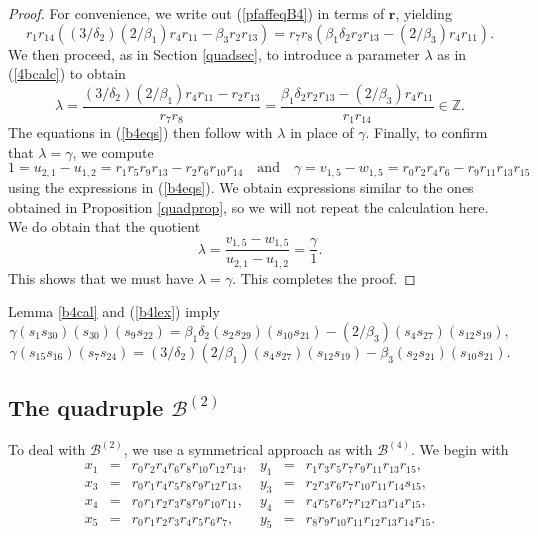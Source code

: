 \documentclass[letterpaper,10pt]{amsart}
\newcommand{\bZ}{{\mathbb{Z}}}
\newcommand{\Br}{{\mathbf{r}}}
\newcommand{\B}{{\mathcal{B}}}
\theoremstyle{definition}
\numberwithin{equation}{section}
\begin{document}
\begin{proof} For convenience, we write out (\ref{pfaffeqB4}) in terms of $\Br$, yielding 
\begin{equation} \label{pfaffeqb4} r_1 r_{14} ((3/\delta_2)(2/\beta_1) r_4 r_{11} - \beta_3 r_2 r_{13}) = r_7 r_8 (\beta_1 \delta_2 r_2 r_{13} - (2/\beta_3) r_4 r_{11}).
\end{equation}
We then proceed, as in Section \ref{quadsec}, to introduce a parameter $\lambda$ as in (\ref{4bcalc}) to obtain 
\[\lambda = \frac{(3/\delta_2)(2/\beta_1) r_4 r_{11} - r_2 r_{13}}{r_7 r_8} = \frac{\beta_1 \delta_2 r_2 r_{13} - (2/\beta_3) r_4 r_{11}}{r_1 r_{14}} \in \bZ. \]
The equations in (\ref{b4eqs}) then follow with $\lambda$ in place of $\gamma$. Finally, to confirm that $\lambda = \gamma$, we compute 
\[1 = u_{2,1} - u_{1,2} = r_1 r_5 r_9 r_{13} - r_2 r_6 r_{10} r_{14} \quad \text{and} \quad \gamma = v_{1,5} - w_{1,5} = r_0 r_2 r_4 r_6 - r_9 r_{11} r_{13} r_{15}   \]
using the expressions in (\ref{b4eqs}). We obtain expressions similar to the ones obtained in Proposition \ref{quadprop}, so we will not repeat the calculation here. We do obtain that the quotient 
\begin{equation} \label{lamgam} \lambda = \frac{v_{1,5} - w_{1,5}}{u_{2,1} - u_{1,2}} = \frac{\gamma}{1}.
\end{equation}
This shows that we must have $\lambda = \gamma$. This completes the proof. 
\end{proof} 

Lemma \ref{b4cal} and (\ref{b4lex}) imply 
\begin{equation} \label{b4caleq}
\gamma (s_1 s_{30})(s_{30})(s_9 s_{22}) = \beta_1 \delta_2 (s_2 s_{29})(s_{10} s_{21}) - (2/\beta_3) (s_4 s_{27})(s_{12} s_{19}),\end{equation}
\[\gamma (s_{15} s_{16})(s_7 s_{24}) = (3/\delta_2)(2/\beta_1) (s_4 s_{27})(s_{12} s_{19}) - \beta_3 (s_2 s_{21})(s_{10} s_{21}). \]

\subsection{The quadruple $\B^{(2)}$}
\label{B2par}  

To deal with $\B^{(2)}$, we use a symmetrical approach as with $\B^{(4)}$. We begin with
\begin{equation} \label{B2quads} \begin{matrix} x_1 & = & r_0 r_2 r_4 r_6 r_8 r_{10} r_{12} r_{14}, & y_1 & = & r_1 r_3 r_5 r_7 r_9 r_{11} r_{13} r_{15}, \\
x_3 & = & r_0 r_1 r_4 r_5 r_8 r_9 r_{12} r_{13}, & y_3 & = & r_2 r_3 r_6 r_7 r_{10} r_{11} r_{14} s_{15}, \\
x_4 & = & r_0 r_1 r_2 r_3 r_8 r_9 r_{10} r_{11}, & y_4 & = & r_4 r_5 r_6 r_7 r_{12} r_{13} r_{14} r_{15}, \\
x_5 & = & r_0 r_1 r_2 r_3 r_4 r_5 r_6 r_7, & y_5 & = & r_8 r_9 r_{10} r_{11} r_{12} r_{13} r_{14} r_{15}. 
\end{matrix}
\end{equation} 
\end{document}
